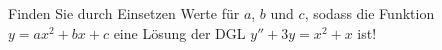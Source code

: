 \item Finden Sie durch Einsetzen Werte für $a$, $b$ und $c$, sodass die Funktion $y=ax^2+bx+c$ eine Lösung der DGL $y''+3y=x^2+x$ ist!
